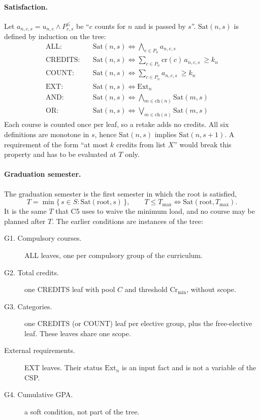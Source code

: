 \documentclass[10pt,a4paper]{article}
\begin{document}
\paragraph{Satisfaction.}
Let $a_{n,c,s}=u_{n,c}\wedge P^{\le}_{c,s}$ be ``$c$ counts for $n$ and is
passed by $s$''. $\mathrm{Sat}(n,s)$ is defined by induction on the tree:
\begin{align*}
  \text{ALL:}\quad     & \mathrm{Sat}(n,s)\iff \textstyle\bigwedge_{c\in P_n} a_{n,c,s}\\
  \text{CREDITS:}\quad & \mathrm{Sat}(n,s)\iff \textstyle\sum_{c\in P_n}\mathrm{cr}(c)\,a_{n,c,s}\ \ge k_n\\
  \text{COUNT:}\quad   & \mathrm{Sat}(n,s)\iff \textstyle\sum_{c\in P_n} a_{n,c,s}\ \ge k_n\\
  \text{EXT:}\quad     & \mathrm{Sat}(n,s)\iff \mathrm{Ext}_n\\
  \text{AND:}\quad     & \mathrm{Sat}(n,s)\iff \textstyle\bigwedge_{m\in\mathrm{ch}(n)} \mathrm{Sat}(m,s)\\
  \text{OR:}\quad      & \mathrm{Sat}(n,s)\iff \textstyle\bigvee_{m\in\mathrm{ch}(n)} \mathrm{Sat}(m,s)
\end{align*}
Each course is counted once per leaf, so a retake adds no credits.
All six definitions are monotone in $s$, hence $\mathrm{Sat}(n,s)$ implies
$\mathrm{Sat}(n,s+1)$. A requirement of the form ``at most $k$ credits from
list $X$'' would break this property and has to be evaluated at $T$ only.
 
\paragraph{Graduation semester.}
The graduation semester is the first semester in which the root is satisfied,
\[
  T=\min\{\,s\in S : \mathrm{Sat}(\mathrm{root},s)\,\},\qquad T\le T_{\max}
  \iff \mathrm{Sat}(\mathrm{root},T_{\max}).
\]
It is the same $T$ that C5 uses to waive the minimum load, and no course may be
planned after $T$. The earlier conditions are instances of the tree:
\begin{description}
  \item[G1. Compulsory courses.] ALL leaves, one per compulsory group of the curriculum.
  \item[G2. Total credits.] one CREDITS leaf with pool $C$ and threshold $\mathrm{Cr}_{\min}$, without scope.
  \item[G3. Categories.] one CREDITS (or COUNT) leaf per elective group, plus the free-elective leaf. These leaves share one scope.
  \item[External requirements.] EXT leaves. Their status $\mathrm{Ext}_n$ is an input fact and is not a variable of the CSP.
  \item[G4. Cumulative GPA.] a soft condition, not part of the tree.
\end{description}
 
\end{document}
